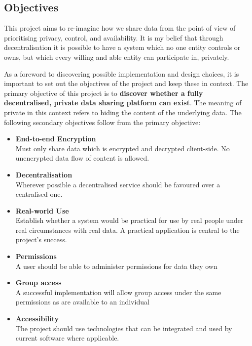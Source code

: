 \subsection{Objectives}

This project aims to re-imagine how we share data from the point of view of prioritising privacy, control, and availability. It is my belief that through decentralisation it is possible to have a system which no one entity controls or owns, but which every willing and able entity can participate in, privately.

As a foreword to discovering possible implementation and design choices, it is important to set out the objectives of the project and keep these in context. The primary objective of this project is to \textbf{discover whether a fully decentralised, private data sharing platform can exist}. The meaning of private in this context refers to hiding the content of the underlying data. The following secondary objectives follow from the primary objective:

\begin{itemize}
  \item \textbf{End-to-end Encryption} \\
  Must only share data which is encrypted and decrypted client-side. No unencrypted data flow of content is allowed.
  \item \textbf{Decentralisation} \\
  Wherever possible a decentralised service should be favoured over a centralised one.
  \item \textbf{Real-world Use} \\
  Establish whether a system would be practical for use by real people under real circumstances with real data. A practical application is central to the project's success.
  \item \textbf{Permissions} \\
  A user should be able to administer permissions for data they own
  \item \textbf{Group access} \\
  A successful implementation will allow group access under the same permissions as are available to an individual
  \item \textbf{Accessibility} \\
  The project should use technologies that can be integrated and used by current software where applicable.
\end{itemize}
